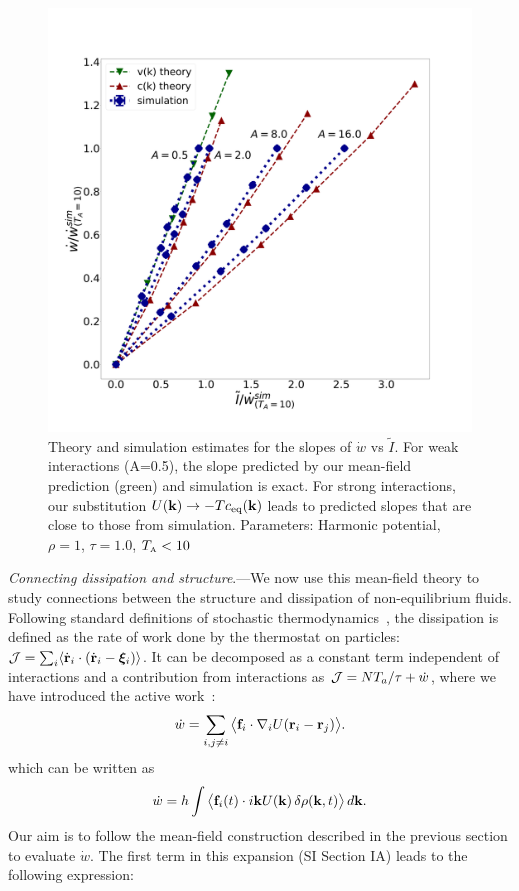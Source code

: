 \documentclass[superscriptaddress, twocolumn, prl, longbibliography, nofootinbib]{revtex4-1}
\newcommand{\A}{\text{\tiny{A}}}
\newcommand{\U}{U}
\begin{document}
\begin{figure}
    \centering
    \includegraphics[scale=0.10, clip=True]{Figure_2.pdf}
    \caption{Theory and simulation estimates for the slopes of $\dot{w}$ vs $\tilde I$. For weak interactions (A=0.5), the slope  predicted by our mean-field prediction (green) and simulation is exact. For strong interactions, our substitution $U({\bf k}) \rightarrow -T c_{\text{eq}}({\bf k})$ leads to predicted slopes that are close to those from simulation.  Parameters: Harmonic potential, $\rho=1$, $\tau=1.0$, $T_\A<10$}
    \label{Fig:2}
\end{figure}

{\it Connecting dissipation and structure}.---We now use this mean-field theory to study connections between the structure and dissipation of non-equilibrium fluids. Following standard definitions of stochastic thermodynamics~\cite{Sekimoto1998, Seifert2012}, the dissipation is defined as the rate of work done by the thermostat on particles: ${\cal J} = \sum_i \langle \dot{\bf r}_i\cdot(\dot{\bf r}_i - {\boldsymbol\xi}_i) \rangle$. It can be decomposed as a constant term independent of interactions and a contribution from interactions as ${\cal J} = N T_a/\tau + \dot w$, where we have introduced the active work~\cite{Suri2019,Suri2020,delJunco_2018}:
\begin{equation}\label{eq:wdot}
    \dot{w} = \sum_{i, j\neq i} \big\langle {\bf f}_i \cdot \nabla_i U({\bf r}_i-{\bf r}_j) \big\rangle .
\end{equation}
which can be written as
\begin{equation}\label{eq:wdot}
    \dot w = h \int \big\langle {\bf f}_i(t) \cdot i{\bf k} \U({\bf k}) \,\delta \rho({\bf k}, t) \big\rangle \,d{\bf k} .
\end{equation}
Our aim is to follow the mean-field construction described in the previous section to evaluate $\dot w$. The first term in this expansion (SI Section IA) leads to the following expression: 
\end{document}
